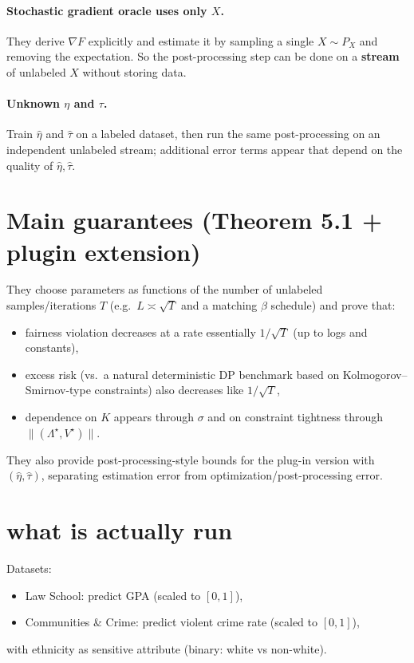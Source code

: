\documentclass[11pt]{article}
\begin{document}
\paragraph{Stochastic gradient oracle uses only $X$.}
They derive $\nabla F$ explicitly and estimate it by sampling a single $X\sim P_X$ and removing the expectation.
So the post-processing step can be done on a \textbf{stream} of unlabeled $X$ without storing data.

\paragraph{Unknown $\eta$ and $\tau$.}
Train $\widehat\eta$ and $\widehat\tau$ on a labeled dataset, then run the same post-processing
on an independent unlabeled stream; additional error terms appear that depend on the quality of
$\widehat\eta,\widehat\tau$.

\section{Main guarantees (Theorem 5.1 + plugin extension)}
They choose parameters as functions of the number of unlabeled samples/iterations $T$
(e.g.\ $L\asymp \sqrt{T}$ and a matching $\beta$ schedule) and prove that:
\begin{itemize}
  \item fairness violation decreases at a rate essentially $1/\sqrt{T}$ (up to logs and constants),
  \item excess risk (vs.\ a natural deterministic DP benchmark based on Kolmogorov--Smirnov-type constraints)
        also decreases like $1/\sqrt{T}$,
  \item dependence on $K$ appears through $\sigma$ and on constraint tightness through $\|(\Lambda^\star,V^\star)\|$.
\end{itemize}
They also provide post-processing-style bounds for the plug-in version with $(\widehat\eta,\widehat\tau)$,
separating estimation error from optimization/post-processing error.

\section{what is actually run}
Datasets:
\begin{itemize}
  \item Law School: predict GPA (scaled to $[0,1]$),
  \item Communities \& Crime: predict violent crime rate (scaled to $[0,1]$),
\end{itemize}
with ethnicity as sensitive attribute (binary: white vs non-white).
\end{document}
